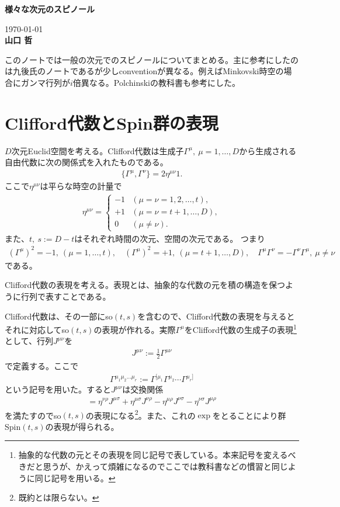 \documentclass[12pt,a4paper]{jlreq}
\begin{document}
\begin{center}
  {\bfseries \LARGE 様々な次元のスピノール}
\end{center}
\begin{flushright}
  \today\\
  {\bfseries 山口 哲}
\end{flushright}
\vspace{1cm}
このノートでは一般の次元でのスピノールについてまとめる。主に参考にしたのは九後氏のノート\cite{Kugo}であるが少しconventionが異なる。例えばMinkovski時空の場合にガンマ行列が$i$倍異なる。Polchinskiの教科書\cite{Polchinski}も参考にした。
\setcounter{tocdepth}{1}
\tableofcontents

\section{Clifford代数とSpin群の表現}
$D$次元Euclid空間を考える。Clifford代数は生成子$\Gamma^{\mu},\ \mu=1,\dots,D$から生成される自由代数に次の関係式を入れたものである。
\begin{align}
  \{\Gamma^{\mu},\Gamma^{\nu}\}=2\eta^{\mu\nu} 1.
  \label{genClifford}
\end{align}
ここで$\eta^{\mu\nu}$は平らな時空の計量で
\begin{align*}
  \eta^{\mu\nu}=
  \begin{cases}
    -1 & (\mu=\nu=1,2,\dots,t),\\
    +1 & (\mu=\nu=t+1,\dots,D),\\
    0 & (\mu\ne\nu).
  \end{cases}
\end{align*}
また、$t,\ s:=D-t$はそれぞれ時間の次元、空間の次元である。
つまり
\begin{align}
  (\Gamma^{\mu})^2=-1,\ (\mu=1,\dots,t),\quad(\Gamma^{\mu})^2=+1,\ (\mu=t+1,\dots,D),\quad \Gamma^{\mu}\Gamma^{\nu}=-\Gamma^{\nu}\Gamma^{\mu},\ \mu\ne\nu
\end{align}
である。

Clifford代数の表現を考える。表現とは、抽象的な代数の元を積の構造を保つように行列で表すことである。

Clifford代数は、その一部にso$(t,s)$を含むので、Clifford代数の表現を与えるとそれに対応してso$(t,s)$の表現が作れる。実際$\Gamma^{\mu}$をClifford代数の生成子の表現\footnote{抽象的な代数の元とその表現を同じ記号で表している。本来記号を変えるべきだと思うが、かえって煩雑になるのでここでは教科書などの慣習と同じように同じ記号を用いる。}として、行列$J^{\mu\nu}$を
\begin{align*}
  J^{\mu\nu}:=\frac12 \Gamma^{\mu\nu}
\end{align*}
で定義する。ここで
\begin{align*}
  \Gamma^{\mu_1\mu_2\dots \mu_r}:=\Gamma^{[\mu_1}\Gamma^{\mu_2}\cdots\Gamma^{\mu_r]}
\end{align*}
という記号を用いた。すると$J^{\mu\nu}$は交換関係
\begin{align*}
  [J^{\mu\nu},J^{\rho\sigma}]=
  \eta^{\nu\rho}J^{\mu\sigma}
  +\eta^{\mu\sigma}J^{\nu\rho}
  -\eta^{\mu\rho}J^{\nu\sigma}
  -\eta^{\nu\sigma}J^{\mu\rho}
\end{align*}
を満たすのでso$(t,s)$の表現になる\footnote{既約とは限らない。}。また、これの$\exp$をとることにより群Spin$(t,s)$の表現が得られる。
\end{document}

